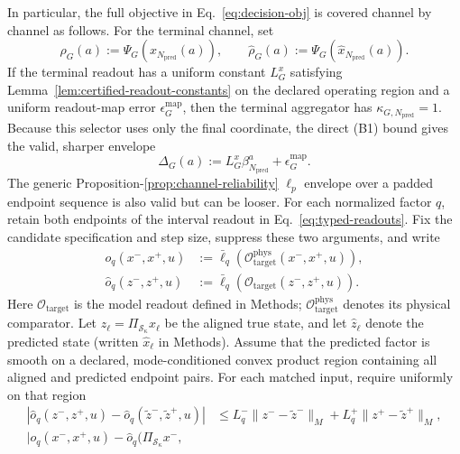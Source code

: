 \begin{corollary}
In particular, the full objective in Eq.~\eqref{eq:decision-obj} is covered
channel by channel as follows.  For the terminal channel, set
\begin{equation}
  \rho_G(a):=\Psi_G(x_{N_{\mathrm{pred}}}(a)),
  \qquad
  \hat\rho_G(a):=\Psi_G(\hat x_{N_{\mathrm{pred}}}(a)).
\end{equation}
If the terminal readout has a uniform constant $L_G^x$ satisfying
Lemma~\ref{lem:certified-readout-constants} on the declared operating region
and a uniform readout-map error $\epsilon_G^{\mathrm{map}}$, then the terminal
aggregator has $\kappa_{G,{N_{\mathrm{pred}}}}=1$.  Because this selector uses only the final
coordinate, the direct (B1) bound gives the valid, sharper envelope
\begin{equation}
  \Delta_G(a):=L_G^x\beta_{N_{\mathrm{pred}}}^a+\epsilon_G^{\mathrm{map}}.
  \label{eq:D2-terminal-channel-envelope}
\end{equation}
The generic Proposition-\ref{prop:channel-reliability} $\ell_p$ envelope over a
padded endpoint sequence is also valid but can be looser.
For each normalized factor $q$, retain both endpoints of the interval
readout in Eq.~\eqref{eq:typed-readouts}. Fix the candidate specification and
step size, suppress these two arguments, and write
\begin{equation}
\begin{aligned}
  o_q(x^-,x^+,u)
  &:=\bar\ell_q\!\left(\mathcal O_{\mathrm{target}}^{\mathrm{phys}}
       (x^-,x^+,u)\right),\\
  \hat o_q(z^-,z^+,u)
  &:=\bar\ell_q\!\left(\mathcal O_{\mathrm{target}}
       (z^-,z^+,u)\right).
\end{aligned}
  \label{eq:D2-factor-readout}
\end{equation}
Here $\mathcal O_{\mathrm{target}}$ is the model readout defined in Methods;
$\mathcal O_{\mathrm{target}}^{\mathrm{phys}}$ denotes its physical comparator.
Let $z_\ell=\Pi_{\mathcal S_\kappa}x_\ell$ be the aligned true state, and
let $\hat z_\ell$ denote the predicted state (written $\hat x_\ell$ in
Methods). Assume that the predicted factor is smooth on a declared,
mode-conditioned convex product region containing all aligned and predicted
endpoint pairs. For each matched input, require uniformly on that region
\begin{align}
 |\hat o_q(z^-,z^+,u)-\hat o_q(\tilde z^-,\tilde z^+,u)|
 &\le L_q^-\|z^--\tilde z^-\|_M
       +L_q^+\|z^+-\tilde z^+\|_M,\label{eq:D2-factor-endpoint-lipschitz}\\
 |o_q(x^-,x^+,u)-\hat o_q(\Pi_{\mathcal S_\kappa}x^-,

\end{align}
\end{corollary}
